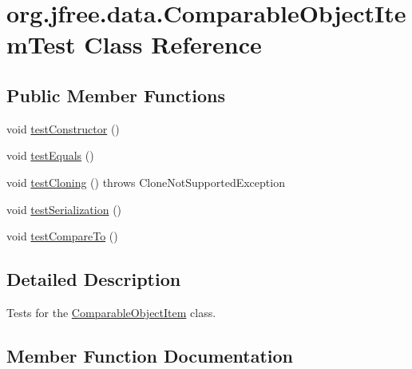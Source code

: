 \hypertarget{classorg_1_1jfree_1_1data_1_1_comparable_object_item_test}{}\section{org.\+jfree.\+data.\+Comparable\+Object\+Item\+Test Class Reference}
\label{classorg_1_1jfree_1_1data_1_1_comparable_object_item_test}
\subsection*{Public Member Functions}
\begin{DoxyCompactItemize}
\item 
void \mbox{\hyperlink{classorg_1_1jfree_1_1data_1_1_comparable_object_item_test_a9bdb4036543d4077ab2852a00a8a568d}{test\+Constructor}} ()
\item 
void \mbox{\hyperlink{classorg_1_1jfree_1_1data_1_1_comparable_object_item_test_a0fe6a38bb11452f93f83ab2d34b5f51d}{test\+Equals}} ()
\item 
void \mbox{\hyperlink{classorg_1_1jfree_1_1data_1_1_comparable_object_item_test_aeb0be5240679bca9996577ac0e88e409}{test\+Cloning}} ()  throws Clone\+Not\+Supported\+Exception 
\item 
void \mbox{\hyperlink{classorg_1_1jfree_1_1data_1_1_comparable_object_item_test_a0ffcd03d6c8ce53e8bb86aa61cb74707}{test\+Serialization}} ()
\item 
void \mbox{\hyperlink{classorg_1_1jfree_1_1data_1_1_comparable_object_item_test_a67abbde15c51ba3be201f8086848c3f6}{test\+Compare\+To}} ()
\end{DoxyCompactItemize}


\subsection{Detailed Description}
Tests for the \mbox{\hyperlink{classorg_1_1jfree_1_1data_1_1_comparable_object_item}{Comparable\+Object\+Item}} class. 

\subsection{Member Function Documentation}
\mbox{\label{classorg_1_1jfree_1_1data_1_1_comparable_object_item_test_aeb0be5240679bca9996577ac0e88e409}} 
